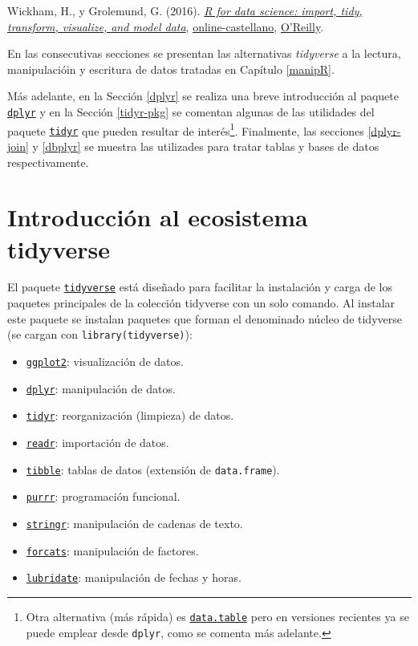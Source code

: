 \documentclass[
]{book}
\providecommand{\tightlist}{%
  \setlength{\itemsep}{0pt}\setlength{\parskip}{0pt}}
\begin{document}
Wickham, H., y Grolemund, G. (2016). \emph{\href{http://r4ds.had.co.nz}{R for data science: import, tidy, transform, visualize, and model data}}, \href{https://es.r4ds.hadley.nz}{online-castellano}, \href{http://shop.oreilly.com/product/0636920034407.do}{O'Reilly}.

En las consecutivas secciones se presentan las alternativas \emph{tidyverse} a la lectura, manipulacióin y escritura de datos tratadas en Capítulo \ref{manipR}.

Más adelante, en la Sección \ref{dplyr} se realiza una breve introducción al paquete \href{https://dplyr.tidyverse.org}{\texttt{dplyr}} y en la Sección \ref{tidyr-pkg} se comentan algunas de las utilidades del paquete \href{https://tidyr.tidyverse.org}{\texttt{tidyr}} que pueden resultar de interés\footnote{Otra alternativa (más rápida) es \href{https://rdatatable.gitlab.io/data.table}{\texttt{data.table}} pero en versiones recientes ya se puede emplear desde \texttt{dplyr}, como se comenta más adelante.}. Finalmente, las secciones \ref{dplyr-join} y \ref{dbplyr} se muestra las utilizades para tratar tablas y bases de datos respectivamente.

\hypertarget{introTidyverse}{%
\section{Introducción al ecosistema tidyverse}\label{introTidyverse}}

El paquete \href{https://tidyverse.tidyverse.org}{\texttt{tidyverse}} está diseñado para facilitar la instalación y carga de los paquetes principales de la colección tidyverse con un solo comando.
Al instalar este paquete se instalan paquetes que forman el denominado núcleo de tidyverse (se cargan con \texttt{library(tidyverse)}):

\begin{itemize}
\tightlist
\item
  \href{https://ggplot2.tidyverse.org}{\texttt{ggplot2}}: visualización de datos.
\item
  \href{https://dplyr.tidyverse.org}{\texttt{dplyr}}: manipulación de datos.
\item
  \href{https://tidyr.tidyverse.org}{\texttt{tidyr}}: reorganización (limpieza) de datos.
\item
  \href{https://readr.tidyverse.org}{\texttt{readr}}: importación de datos.
\item
  \href{https://tibble.tidyverse.org}{\texttt{tibble}}: tablas de datos (extensión de \texttt{data.frame}).
\item
  \href{https://purrr.tidyverse.org}{\texttt{purrr}}: programación funcional.
\item
  \href{https://github.com/tidyverse/stringr}{\texttt{stringr}}: manipulación de cadenas de texto.
\item
  \href{https://github.com/tidyverse/forcats}{\texttt{forcats}}: manipulación de factores.
\item
  \href{https://github.com/tidyverse/lubridate}{\texttt{lubridate}}: manipulación de fechas y horas.
\end{itemize}
\end{document}
